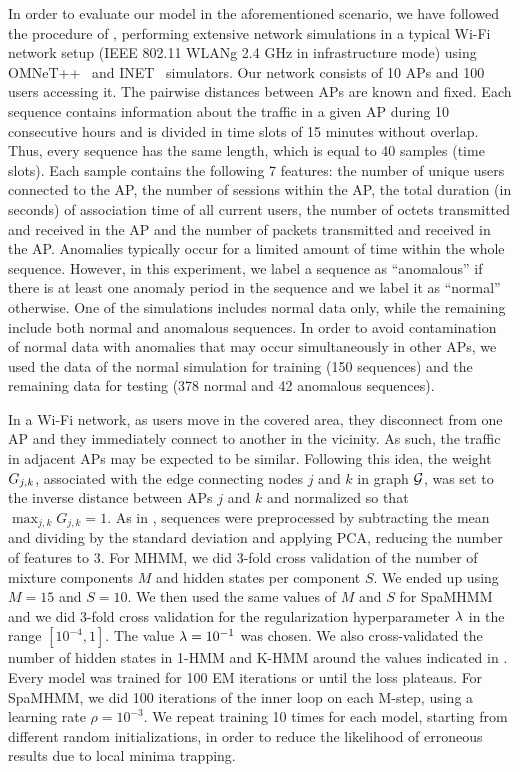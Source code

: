 In order to evaluate our model in the aforementioned scenario, we have followed the procedure of \cite{Anisa2017}, performing extensive network simulations in a typical Wi-Fi network setup (IEEE 802.11 WLANg 2.4 GHz in infrastructure mode) using OMNeT++~\cite{omnetpp} and INET~\cite{inet} simulators. Our network consists of 10 APs and 100 users accessing it. The pairwise distances between APs are known and fixed. Each sequence contains information about the traffic in a given AP during 10 consecutive hours and is divided in time slots of 15 minutes without overlap. Thus, every sequence has the same length, which is equal to 40 samples (time slots). Each sample contains the following 7 features: the number of unique users connected to the AP, the number of sessions within the AP, the total duration (in seconds) of association time of all current users, the number of octets transmitted and received in the AP and the number of packets transmitted and received in the AP. Anomalies typically occur for a limited amount of time within the whole sequence. However, in this experiment, we label a sequence as ``anomalous'' if there is at least one anomaly period in the sequence and we label it as ``normal'' otherwise. One of the simulations includes normal data only, while the remaining include both normal and anomalous sequences. In order to avoid contamination of normal data with anomalies that may occur simultaneously in other APs, we used the data of the normal simulation for training (150 sequences) and the remaining data for testing (378 normal and 42 anomalous sequences). 

In a Wi-Fi network, as users move in the covered area, they disconnect from one AP and they immediately connect to another in the vicinity. As such, the traffic in adjacent APs may be expected to be similar. Following this idea, the weight ${G}_{j,k}$, associated with the edge connecting nodes $j$ and $k$ in graph ${\mathcal{G}}$, was set to the inverse distance between APs $j$ and $k$ and normalized so that $\max_{j,k} G_{j,k}=1$. As in \cite{Anisa2017}, sequences were preprocessed by subtracting the mean and dividing by the standard deviation and applying PCA, reducing the number of features to 3. For MHMM, we did 3-fold cross validation of the number of mixture components $M$ and hidden states per component $S$. We ended up using $M=15$ and $S=10$. We then used the same values of $M$ and $S$ for SpaMHMM and we did 3-fold cross validation for the regularization hyperparameter $\lambda$ in the range $[10^{-4}, 1]$. The value $\lambda=10^{-1}$ was chosen. We also cross-validated the number of hidden states in 1-HMM and K-HMM around the values indicated in . Every model was trained for 100 EM iterations or until the loss plateaus. For SpaMHMM, we did 100 iterations of the inner loop on each M-step, using a learning rate $\rho=10^{-3}$. We repeat training 10 times for each model, starting from different random initializations, in order to reduce the likelihood of erroneous results due to local minima trapping.

